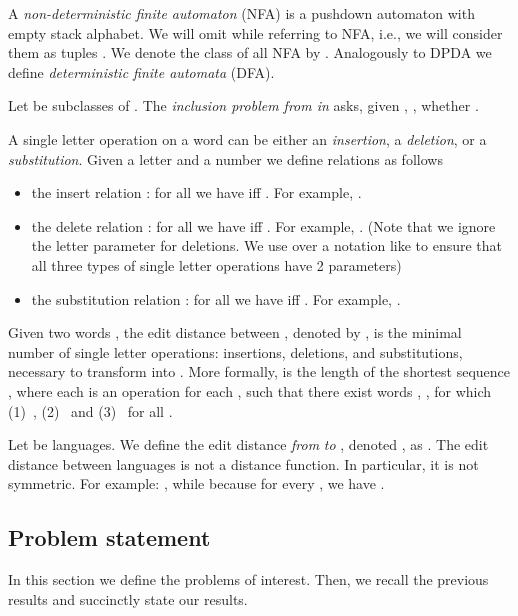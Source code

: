 \documentclass{CSML}
\begin{document}
 A \emph{non-deterministic finite automaton} (NFA) is 
a pushdown automaton with empty stack alphabet. We will omit  while referring to 
NFA, i.e., we will consider them as tuples .
We denote the class of all NFA by .
Analogously to DPDA we define \emph{deterministic finite automata} (DFA).

 Let  be subclasses of . 
The \emph{inclusion problem from  in } asks, 
given , , whether .


A single letter operation on a word can be either an {\em insertion}, a {\em deletion}, or a {\em substitution}.
Given a  letter  and a number  we define relations  as follows

\begin{itemize}
\item 
the insert relation : for all  we have  iff . For example, . 
\item the delete relation : for all  we have  
iff . For example, . (Note that we ignore the letter parameter for deletions. We use  over a notation like  to ensure that all three types of single letter operations have 2 parameters)
\item the substitution relation : for all  we have  
iff . For example, .
\end{itemize}


 Given two words , the edit 
distance between , denoted by , is the minimal number of single letter operations:
insertions, deletions, and substitutions, necessary to transform  into .
More formally,  is the length of the shortest sequence , 
 where each  is an operation  for each , such that there exist words , , for which (1)~, (2)~ and (3)~ for all .



Let  be languages. We define the edit distance 
\emph{from}  \emph{to} , denoted , as
.
The edit distance between languages is not a distance function. In particular,
it is not symmetric. 
For example: , while
 because for every , we have 
.

\subsection{Problem statement}

In this section we define the problems of interest. Then, we recall the previous results 
and succinctly state our results. 
\end{document}
